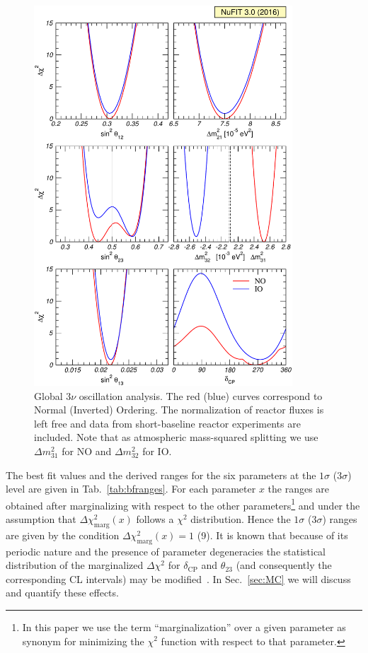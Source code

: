 \documentclass[a4paper, 11pt]{article}
\newcommand{\Dmq}{\Delta m^2}
\newenvironment{pagefigure}{\begin{figure}[!p]}{\afterpage\clearpage\end{figure}}
\begin{document}
\begin{pagefigure}\centering
\includegraphics[width=0.86\textwidth]{fig-chisq-glob}
  \caption{Global $3\nu$ oscillation analysis. The red (blue) curves
    correspond to Normal (Inverted) Ordering.  The normalization of
    reactor fluxes is left free and data from short-baseline reactor
    experiments are included.  Note that as atmospheric mass-squared
    splitting we use $\Dmq_{31}$ for NO and $\Dmq_{32}$ for IO.}
  \label{fig:chisq-glob}
\end{pagefigure}

The best fit values and the derived ranges for the six parameters at
the $1\sigma$ ($3\sigma$) level are given in Tab.~\ref{tab:bfranges}.
For each parameter $x$ the ranges are obtained after marginalizing
with respect to the other parameters\footnote{In this paper we use the
  term ``marginalization'' over a given parameter as synonym for
  minimizing the $\chi^2$ function with respect to that parameter.}
and under the assumption that $\Delta\chi_\text{marg}^2(x)$ follows a
$\chi^2$ distribution. Hence the $1\sigma$ ($3\sigma$) ranges are
given by the condition $\Delta\chi_\text{marg}^2(x)=1$ (9). It is
known that because of its periodic nature and the presence of
parameter degeneracies the statistical distribution of the
marginalized $\Delta\chi^2$ for $\delta_\text{CP}$ and $\theta_{23}$
(and consequently the corresponding CL intervals) may be
modified~\cite{Schwetz:2006md, Blennow:2014sja}.  In Sec.~\ref{sec:MC}
we will discuss and quantify these effects.
\end{document}
